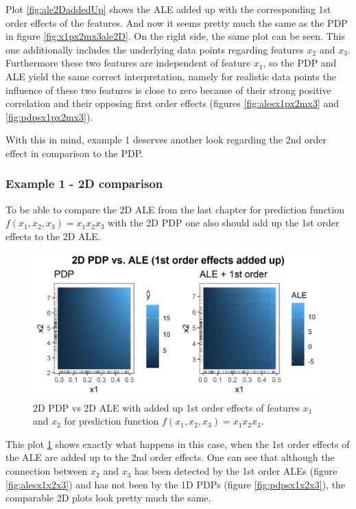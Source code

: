 \documentclass[
]{krantz}
\begin{document}
Plot \ref{fig:ale2DaddedUp} shows the ALE added up with the corresponding 1st order effects of the features. And now it seems pretty much the same as the PDP in figure \ref{fig:x1px2mx3ale2D}. On the right side, the same plot can be seen. This one additionally includes the underlying data points regarding features \(x_2\) and \(x_3\). Furthermore these two features are independent of feature \(x_1\), so the PDP and ALE yield the same correct interpretation, namely for realistic data points the influence of these two features is close to zero because of their strong positive correlation and their opposing first order effects (figures \ref{fig:alesx1px2mx3} and \ref{fig:pdpsx1px2mx3}).

With this in mind, example 1 deserves another look regarding the 2nd order effect in comparison to the PDP.

\hypertarget{example-1---2d-comparison}{%
\subsubsection{Example 1 - 2D comparison}\label{example-1---2d-comparison}}

To be able to compare the 2D ALE from the last chapter for prediction function \(f(x_1, x_2, x_3) = x_1 x_2 x_3\) with the 2D PDP one also should add up the 1st order effects to the 2D ALE.

\begin{figure}
\includegraphics[width=1\linewidth]{images/ale_1_comp_2d_1st_orders_added_x1x2x3_150_0_0p5_5_1} \caption{2D PDP vs 2D ALE with added up 1st order effects of features \(x_1\) and \(x_2\) for prediction function \(f(x_1, x_2, x_3) = x_1 x_2 x_3\).}\label{fig:ale2DaddedUpx1x2x3}
\end{figure}



This plot \ref{fig:ale2DaddedUpx1x2x3} shows exactly what happens in this case, when the 1st order effects of the ALE are added up to the 2nd order effects. One can see that although the connection between \(x_2\) and \(x_3\) has been detected by the 1st order ALEs (figure \ref{fig:alesx1x2x3}) and has not been by the 1D PDPs (figure \ref{fig:pdpsx1x2x3}), the comparable 2D plots look pretty much the same.
\end{document}
